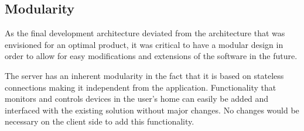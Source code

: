 \subsection{Modularity}
\label{sec:modularity}
As the final development architecture deviated from the architecture that was envisioned for an optimal product, it was critical to have a modular design in order to allow for easy modifications and extensions of the software in the future. 

The server has an inherent modularity in the fact that it is based on stateless connections making it independent from the application. Functionality that monitors and controls devices in the user's home can easily be added and interfaced with the existing solution without major changes. No changes would be necessary on the client side to add this functionality.